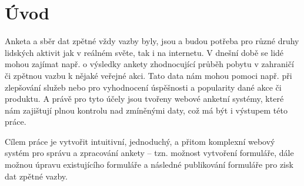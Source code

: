 \chapter{Úvod}

Anketa a sběr dat zpětné vždy vazby byly, jsou a budou potřeba pro různé druhy lidských aktivit jak v reálném světe, tak i na internetu. V dnešní době se lidé mohou zajímat např. o výsledky ankety zhodnocující průběh pobytu v zahraničí či zpětnou vazbu k nějaké veřejné akci. Tato data nám mohou pomoci např. při zlepšování služeb nebo pro vyhodnocení úspěšnosti a popularity dané akce či produktu. A právě pro tyto účely jsou tvořeny webové anketní systémy, které nám zajištují plnou kontrolu nad zmíněnými daty, což má být i výstupem této práce.

Cílem práce je vytvořit intuitivní, jednoduchý, a přitom komplexní webový systém pro správu a zpracování ankety – tzn. možnost vytvoření formuláře, dále možnou úpravu existujícího formuláře a následné publikování formuláře pro zisk dat zpětné vazby.
